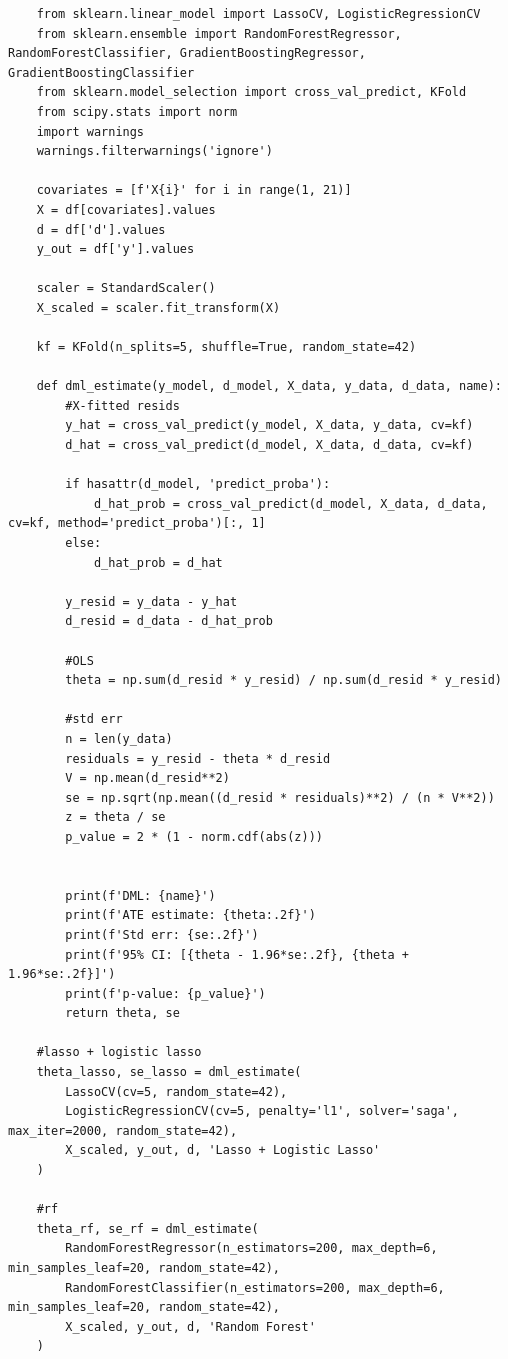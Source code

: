 \documentclass[10pt]{article}
\begin{document}
\begin{lstlisting}
    from sklearn.linear_model import LassoCV, LogisticRegressionCV
    from sklearn.ensemble import RandomForestRegressor, RandomForestClassifier, GradientBoostingRegressor, GradientBoostingClassifier
    from sklearn.model_selection import cross_val_predict, KFold 
    from scipy.stats import norm
    import warnings
    warnings.filterwarnings('ignore')

    covariates = [f'X{i}' for i in range(1, 21)]
    X = df[covariates].values 
    d = df['d'].values
    y_out = df['y'].values

    scaler = StandardScaler()
    X_scaled = scaler.fit_transform(X)

    kf = KFold(n_splits=5, shuffle=True, random_state=42)

    def dml_estimate(y_model, d_model, X_data, y_data, d_data, name):
        #X-fitted resids 
        y_hat = cross_val_predict(y_model, X_data, y_data, cv=kf)
        d_hat = cross_val_predict(d_model, X_data, d_data, cv=kf)

        if hasattr(d_model, 'predict_proba'):
            d_hat_prob = cross_val_predict(d_model, X_data, d_data, cv=kf, method='predict_proba')[:, 1]
        else: 
            d_hat_prob = d_hat 

        y_resid = y_data - y_hat 
        d_resid = d_data - d_hat_prob 

        #OLS 
        theta = np.sum(d_resid * y_resid) / np.sum(d_resid * y_resid)

        #std err
        n = len(y_data)
        residuals = y_resid - theta * d_resid
        V = np.mean(d_resid**2)
        se = np.sqrt(np.mean((d_resid * residuals)**2) / (n * V**2))
        z = theta / se
        p_value = 2 * (1 - norm.cdf(abs(z)))


        print(f'DML: {name}')
        print(f'ATE estimate: {theta:.2f}')
        print(f'Std err: {se:.2f}')
        print(f'95% CI: [{theta - 1.96*se:.2f}, {theta + 1.96*se:.2f}]')
        print(f'p-value: {p_value}')
        return theta, se

    #lasso + logistic lasso 
    theta_lasso, se_lasso = dml_estimate(
        LassoCV(cv=5, random_state=42),
        LogisticRegressionCV(cv=5, penalty='l1', solver='saga', max_iter=2000, random_state=42),
        X_scaled, y_out, d, 'Lasso + Logistic Lasso'
    )

    #rf 
    theta_rf, se_rf = dml_estimate(
        RandomForestRegressor(n_estimators=200, max_depth=6, min_samples_leaf=20, random_state=42),
        RandomForestClassifier(n_estimators=200, max_depth=6, min_samples_leaf=20, random_state=42),
        X_scaled, y_out, d, 'Random Forest'
    )


\end{lstlisting}
\end{document}
